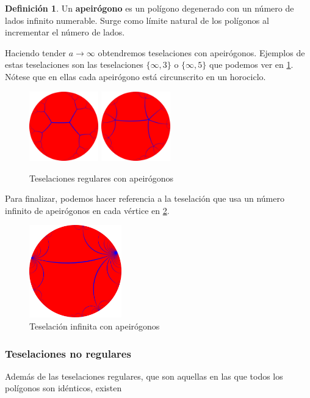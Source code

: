 \documentclass{article}
\theoremstyle{plain}
\theoremstyle{definition}
\newtheorem{definition}{Definición}
\theoremstyle{remark}
\begin{document}
\begin{definition}
  Un \textbf{apeirógono} es un polígono degenerado con un número de
  lados infinito numerable. Surge como límite natural de los polígonos
  al incrementar el número de lados.
\end{definition}

Haciendo tender $a \to \infty$ obtendremos teselaciones con apeirógonos.
Ejemplos de estas teselaciones son las teselaciones $\{\infty,3\}$ o
$\{\infty,5\}$ que podemos ver en \ref{tiling3}. Nótese que en ellas
cada apeirógono está circunscrito en un horociclo.

\begin{figure}[ht!]
  \centering
  \includegraphics[width=30mm]{./tiling-i-3.png}
  \includegraphics[width=30mm]{./tiling-i-5.png}
  \caption{Teselaciones regulares con apeirógonos \label{tiling3}}
\end{figure}

Para finalizar, podemos hacer referencia a la teselación que usa un
número infinito de apeirógonos en cada vértice en \ref{tiling4}.

\begin{figure}[ht!]
  \centering
  \includegraphics[width=40mm]{./tiling-i-i.png}
  \caption{Teselación infinita con apeirógonos \label{tiling4}}
\end{figure}

\subsubsection{Teselaciones no regulares}
Además de las teselaciones regulares, que son aquellas en las que
todos los polígonos son idénticos, existen
\end{document}
